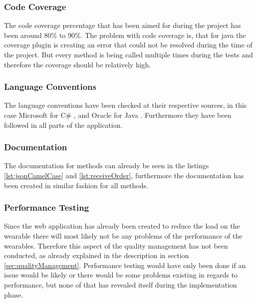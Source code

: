 \subsubsection{Code Coverage}
The code coverage percentage that has been aimed for during the project has been around 80\% to 90\%. The problem with code coverage is, that for java the coverage plugin is creating an error that could not be resolved during the time of the project. But every method is being called multiple times during the tests and therefore the coverage should be relatively high. 
\subsubsection{Language Conventions}
The language conventions have been checked at their respective sources, in this case Microsoft for C\# \citep{manual:csSpecification}, and Oracle for Java \citep{manual:javaSpecification}. Furthermore they have been followed in all parts of the application.
\subsubsection{Documentation}
The documentation for methods can already be seen in the listings \ref{lst:jsonCamelCase} and \ref{lst:receiveOrder}, furthermore the documentation has been created in similar fashion for all methods. 
\subsubsection{Performance Testing}
Since the web application has already been created to reduce the load on the wearable there will most likely not be any problems of the performance of the wearables. Therefore this aspect of the quality management has not been conducted, as already explained in the description in section \ref{sec:qualityManagement}. Performance testing would have only been done if an issue would be likely or there would be some problems existing in regards to performance, but none of that has revealed itself during the implementation phase.